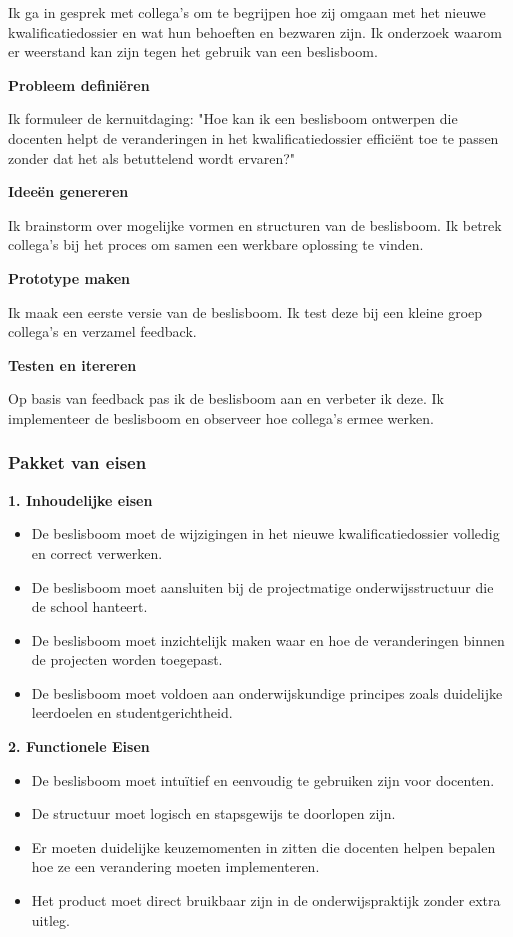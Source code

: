     Ik ga in gesprek met collega's
 om te begrijpen hoe zij omgaan met het nieuwe kwalificatiedossier en wat hun behoeften en bezwaren zijn.
    Ik onderzoek waarom er weerstand kan zijn tegen het gebruik van een beslisboom.

\textbf{Probleem definiëren}

    Ik formuleer de kernuitdaging: "Hoe kan ik een beslisboom ontwerpen die docenten helpt de veranderingen in het kwalificatiedossier efficiënt toe te passen zonder dat het als betuttelend wordt ervaren?"

\textbf{Ideeën genereren}

    Ik brainstorm over mogelijke vormen en structuren van de beslisboom.
    Ik betrek collega's
 bij het proces om samen een werkbare oplossing te vinden.

\textbf{Prototype maken}

    Ik maak een eerste versie van de beslisboom.
    Ik test deze bij een kleine groep collega's
 en verzamel feedback.

\textbf{Testen en itereren}

    Op basis van feedback pas ik de beslisboom aan en verbeter ik deze.
    Ik implementeer de beslisboom en observeer hoe collega's
 ermee werken.

\subsubsection{Pakket van eisen}    
\textbf{1. Inhoudelijke eisen}
\begin{itemize}
    \item De beslisboom moet de wijzigingen in het nieuwe kwalificatiedossier volledig en correct verwerken.
    \item De beslisboom moet aansluiten bij de projectmatige onderwijsstructuur die de school hanteert.
    \item De beslisboom moet inzichtelijk maken waar en hoe de veranderingen binnen de projecten worden toegepast.
    \item De beslisboom moet voldoen aan onderwijskundige principes zoals duidelijke leerdoelen en studentgerichtheid.
\end{itemize}

\textbf{2. Functionele Eisen}
\begin{itemize}
    \item De beslisboom moet intuïtief en eenvoudig te gebruiken zijn voor docenten.
    \item De structuur moet logisch en stapsgewijs te doorlopen zijn.
    \item Er moeten duidelijke keuzemomenten in zitten die docenten helpen bepalen hoe ze een verandering moeten implementeren.
    \item Het product moet direct bruikbaar zijn in de onderwijspraktijk zonder extra uitleg.
\end{itemize}

